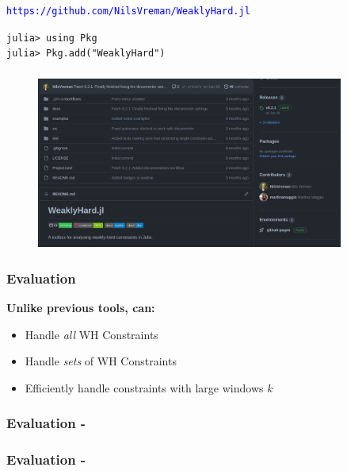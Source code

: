 \begin{frame}
    \frametitle{\tool{}}
    \begin{center}
        \textcolor{blue}{\texttt{https://github.com/NilsVreman/WeaklyHard.jl}}
    \end{center}

    \vspace{1cm}
    \texttt{julia> using Pkg}\\
    \texttt{julia> Pkg.add("WeaklyHard")}
\end{frame}

\begin{frame}
    \frametitle{\tool{}}
    \begin{figure}[h]
        \centering
        \includegraphics[width=0.9\textwidth]{figs/rtas22b/git.png}
    \end{figure}
\end{frame}

\begin{frame}
    \frametitle{\tool{} Evaluation}

    \begin{minipage}[c]{0.49\textwidth}
        \textbf{Unlike previous tools, \tool{} can:} 
        \begin{itemize}
            \item Handle \emph{all} WH Constraints
            \item Handle \emph{sets} of WH Constraints
            \item Efficiently handle constraints with large windows $k$
        \end{itemize}
    \end{minipage}\hfill
    \begin{minipage}[c]{0.49\textwidth}
        \centering
        
    \end{minipage}
\end{frame}

\begin{frame}
    \frametitle{\tool{} Evaluation - \tAH{}}
    
\end{frame}

\begin{frame}
    \frametitle{\tool{} Evaluation - \tRH{}}
    
\end{frame}

